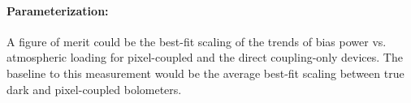 \paragraph{Parameterization:}
A figure of merit could be the best-fit scaling of the trends of bias power vs. atmospheric loading for pixel-coupled and the direct coupling-only devices. The baseline to this measurement would be the average best-fit scaling between true dark and pixel-coupled bolometers.
